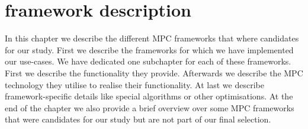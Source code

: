\chapter{framework description}
In this chapter we describe the different MPC frameworks that where candidates for our study. First we describe the frameworks for which we have implemented our use-cases. We have dedicated one subchapter for each of these frameworks.
First we describe the functionality they provide. Afterwards we describe the MPC technology they utilise to realise their functionality. At last we describe framework-specific details like special algorithms or other optimisations. At the end of the chapter we also provide a brief overview over some MPC frameworks that were candidates for our study but are not part of our final selection.

